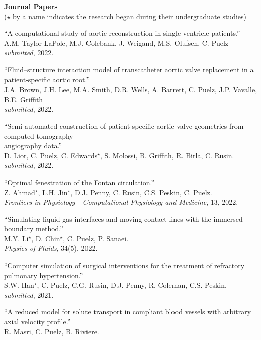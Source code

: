\documentclass{article} %
\begin{document}
\vspace{0.5cm}
\noindent
{\bf \large Journal Papers}\\
{\footnotesize($\star$ by a name indicates the research began during their undergraduate studies)}
\begin{etaremune}
\item ``A computational study of aortic reconstruction in single ventricle patients.'' \\
A.M. Taylor-LaPole, M.J. Colebank, J. Weigand, M.S. Olufsen, C. Puelz \\
{\em submitted}, 2022.
\item ``Fluid–structure interaction model of transcatheter aortic valve replacement in a patient-specific aortic root.'' \\
J.A. Brown, J.H. Lee, M.A. Smith, D.R. Wells, A. Barrett, C. Puelz, J.P. Vavalle, B.E. Griffith \\
{\em submitted}, 2022.
\item ``Semi-automated construction of patient-specific aortic valve geometries from computed tomography\\ angiography data.'' \\
D. Lior, C. Puelz, C. Edwards$^\star$, S. Molossi, B. Griffith, R. Birla, C. Rusin. \\
{\em submitted}, 2022.
\item ``Optimal fenestration of the Fontan circulation.'' \\
Z. Ahmad$^\star$, L.H. Jin$^\star$, D.J. Penny, C. Rusin, C.S. Peskin, C. Puelz. \\
{\em Frontiers in Physiology - Computational Physiology and Medicine}, 13, 2022.
\item ``Simulating liquid-gas interfaces and moving contact lines with the immersed boundary method.'' \\
M.Y. Li$^\star$, D. Chin$^\star$, C. Puelz, P. Sanaei. \\
{\em Physics of Fluids}, 34(5), 2022.
\item ``Computer simulation of surgical interventions for the treatment of refractory pulmonary hypertension.'' \\
S.W. Han$^\star$, C. Puelz, C.G. Rusin, D.J. Penny, R. Coleman, C.S. Peskin. \\
{\em submitted}, 2021.
\item ``A reduced model for solute transport in compliant blood vessels with arbitrary axial velocity profile.'' \\
R. Masri, C. Puelz, B. Riviere. \\

\end{etaremune}
\end{document}
